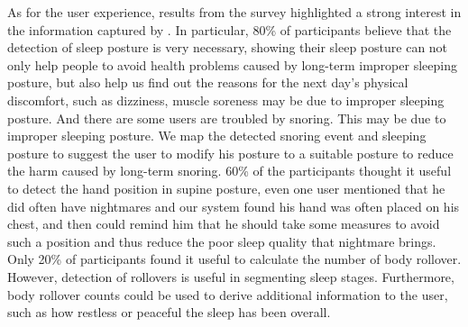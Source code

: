 As for the user experience, results from the survey highlighted a strong interest in the information captured by {\systemname}. In particular, 80\% of participants believe that the detection of sleep posture is very necessary, showing their sleep posture can not only help people to avoid health problems caused by long-term improper sleeping posture, but also help us find out the reasons for the next day's physical discomfort, such as dizziness, muscle soreness may be due to improper sleeping posture. And there are some users are troubled by snoring. This may be due to improper sleeping posture. We map the detected snoring event and sleeping posture to suggest the user to modify his posture to a suitable posture to reduce the harm caused by long-term snoring. 60\% of the participants thought it useful to detect the hand position in supine posture, even one user mentioned that he did often have nightmares and our system found his hand was often placed on his chest, and then {\systemname} could remind him that he should take some measures to avoid such a position and thus reduce the poor sleep quality that nightmare brings. Only 20\% of participants found it useful to calculate the number of body rollover. However, detection of rollovers is useful in segmenting sleep stages. Furthermore, body rollover counts could be used to derive additional information to the user, such as how restless or peaceful the sleep has been overall.



